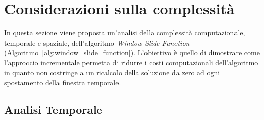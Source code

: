 
\section{Considerazioni sulla complessità}\label{sec:considerazioni_sulla_complessità}

In questa sezione viene proposta un'analisi della complessità computazionale, temporale e spaziale, dell'algoritmo \textit{Window Slide Function} (Algoritmo~\ref{alg:window_slide_function}).
L'obiettivo è quello di dimostrare come l'approccio incrementale permetta di ridurre i costi computazionali dell'algoritmo in quanto non costringe a un ricalcolo della soluzione da zero ad ogni spostamento della finestra temporale.

\subsection*{Analisi Temporale}

